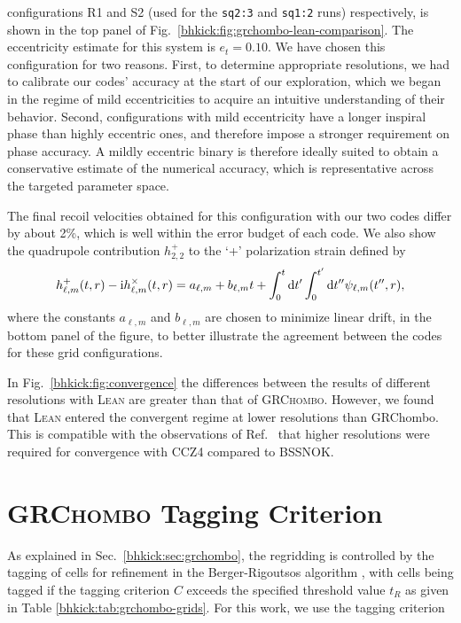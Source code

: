 configurations R1 and S2 (used for the \texttt{sq2:3} and \texttt{sq1:2} runs)
respectively, is shown in the top panel of Fig.~\ref{bhkick:fig:grchombo-lean-comparison}.
The eccentricity estimate for this system is $e_t=0.10$. We have chosen
this configuration for two reasons. First, to determine appropriate
resolutions, we had to calibrate our codes' accuracy at the start of
our exploration, which we began in the regime of mild eccentricities to
acquire an intuitive understanding of their behavior. Second,
configurations with mild eccentricity have a longer inspiral phase
than highly eccentric ones, and therefore impose a stronger requirement
on phase accuracy. A mildly eccentric binary is therefore ideally suited
to obtain a conservative estimate of the numerical accuracy, which is representative across the targeted parameter space.

The final recoil velocities obtained for this configuration with
our two codes differ by about 2\%, which is well within the error budget
of each code.
We also show the quadrupole contribution
$h^+_{2,2}$ to the `+' polarization strain defined by \cite{Bishop:2016lgv}
\begin{equation}
    h^+_{\ell,m}(t,r)-\mathrm{i}h^\times_{\ell,m}(t,r)
    = a_{\ell,m} + b_{\ell,m}t + \int_0^t\mathrm{d} t^\prime\int_0^{t^\prime}
    \mathrm{d} t^{\prime\prime}\psi_{\ell,m}(t^{\prime\prime},r),
    \label{bhkick:eq:strain}
\end{equation}
where the constants $a_{\ell,m}$ and $b_{\ell,m}$ are chosen to minimize
linear drift,
in the bottom panel of the figure, to better illustrate the agreement
between the codes for these grid configurations.

In Fig.~\ref{bhkick:fig:convergence} the differences between the results of
different resolutions with \textsc{Lean} are greater than that of
\textsc{GRChombo}. However, we found that \textsc{Lean} entered the
convergent regime at lower resolutions than {\sc GRChombo}. This is compatible
with the observations of Ref.~\cite{Alic:2011gg} that higher resolutions
were required for convergence with CCZ4 compared to BSSNOK.




\section{\textsc{GRChombo} Tagging Criterion}
\label{bhkick:sec:tagging}
%
%
As explained in Sec.~\ref{bhkick:sec:grchombo}, the regridding is controlled by
the tagging of cells for refinement in the Berger-Rigoutsos algorithm
\cite{Berger1991}, with cells being tagged if the tagging criterion $C$
exceeds the specified threshold value $t_R$ as given in Table
\ref{bhkick:tab:grchombo-grids}. For this work, we use the
tagging criterion

